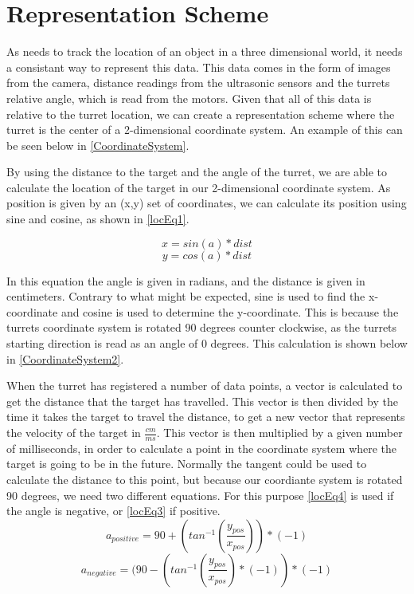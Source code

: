 \section{Representation Scheme}\label{RepScheme}
As \name needs to track the location of an object in a three dimensional world,
it needs a consistant way to represent this data. This data comes in the form
of images from the camera, distance readings from the ultrasonic sensors and
the turrets relative angle, which is read from the motors. Given that all of
this data is relative to the turret location, we can create a representation
scheme where the turret is the center of a 2-dimensional coordinate system. An
example of this can be seen below in \autoref{CoordinateSystem}.\nl


By using the distance to the target and the angle of the turret, we are able to
calculate the location of the target in our 2-dimensional coordinate system.
As position is given by an (x,y) set of coordinates, we can calculate its
position using sine and cosine, as shown in \autoref{locEq1}.

\begin{equation}\label{locEq1}
x=sin(a)*dist
\end{equation}
\begin{equation}\label{locEq2}
y=cos(a)*dist
\end{equation} 

In this equation the angle  is given in radians, and the distance
 is given in centimeters. Contrary to what might be expected, sine
is used to find the x-coordinate and cosine is used to determine the
y-coordinate. This is because the turrets coordinate system is rotated 90
degrees counter clockwise, as the turrets starting direction is read as an angle
of 0 degrees. This calculation is shown below in \autoref{CoordinateSystem2}.


When the turret has registered a number of data points, a vector is
calculated to get the distance that the target has travelled. This vector is
then divided by the time it takes the target to travel the distance, to get a
new vector that represents the velocity of the target in $\frac{cm}{ms}$. This
vector is then multiplied by a given number of milliseconds, in order to
calculate a point in the coordinate system where the target is going to be in
the future. Normally the tangent could be used to calculate the distance
to this point, but because our coordiante system is rotated 90 degrees, we need two
different equations. For this purpose \autoref{locEq4} is used if the angle is
negative, or \autoref{locEq3} if positive.
\begin{equation}\label{locEq3}
a_{positive}=90+(tan^{-1}(\frac{y_{pos}}{x_{pos}}))*(-1)
\end{equation} 
\begin{equation}\label{locEq4}
a_{negative}=(90-(tan^{-1}(\frac{y_{pos}}{x_{pos}})*(-1))*(-1)
\end{equation} 


